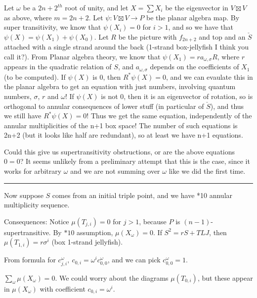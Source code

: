 \documentclass[12pt]{article}
\begin{document}
Let $\omega$ be a $2n+2^{th}$ root of unity, and let $X=\sum X_{i}$ be the eigenvector in $V\boxtimes V$ as above, where $m=2n+2$. Let $\psi: V\boxtimes V\rightarrow P$ be the planar algebra map.  By super transitivity, we know that $\psi(X_i)=0$ for $i>1$, and so we have that $\psi(X)=\psi(X_1)+\psi(X_0)$.  Let $R$ be the picture with $f_{2n+2}$ and top and an $\check{S}$ attached with a single strand around the back (1-strand box-jellyfish I think you call it?).  From Planar algebra theory, we know that $\psi(X_1)=r a_{\omega, \sigma} R$, where $r$ appears in the quadratic relation of $S$, and $a_{\omega, \sigma}$ depends on the coefficients of $X_1$ (to be computed).  If $\psi(X)$ is $0$, then $R^{*}\psi(X)=0$, and we can evaulate this in the planar algebra to get an equation with just numbers, involving quantum numbers, $\sigma$, $r$ and $\omega$!  If $\psi(X)$ is not $0$, then it is an eigenvector of rotation, so is orthogonal to annular consequences of lower stuff (in particular of $\check{S}$), and thus we still have $R^{*}\psi(X)=0$!  Thus we get the same equation, independently of the annular multiplicities of the n+1 box space!  The number of such equations is 2n+2 (but it looks like half are redundant), so at least we have n+1 equations.  


Could this give us supertransitivity obstructions, or are the above equations  $0=0$?  It seems unlikely from a preliminary attempt that this is the case, since it works for arbitrary $\omega$ and we are not summing over $\omega$ like we did the first time.

\bigskip

\hrule

\bigskip




Now suppose $S$ comes from an initial triple point, and we have *10 annular multiplicity sequence.

Consequences:
Notice $\mu(T_{j,i})=0$ for $j>1$, because $P$ is $(n-1)$-supertransitive. 
 By $*10$ assumption, $\mu(X_{\omega})=0$.
If $S^{2}= r S + TLJ$, then $\mu(T_{1,i})=r \sigma^{i}$ (box 1-strand jellyfish).

From formula for $c^{\omega}_{j,i},\ c_{0,i}=\omega^{i} c^{\omega}_{0,0}$, and we can pick $c^{\omega}_{0,0} = 1$.

$\sum_{\omega} \mu(X_{\omega})=0$.
We could worry about the diagrams $\mu(T_{0,i})$, but these appear in $\mu(X_{\omega})$ with coefficient $c_{0,i}=\omega^{i}$.
\end{document}

